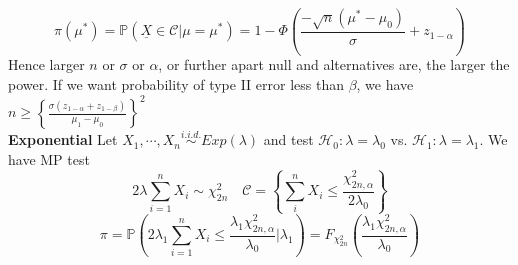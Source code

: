 \documentclass[8pt]{article}
\begin{document}
\begin{multicols}{3}
{\[   \]
   \[
      \pi(\mu^*) = \mathbb{P}(\underline{X} \in \mathcal{C} | \mu = \mu^*) = 1 - \Phi\left( \frac{-\sqrt{n}(\mu^* - \mu_0)}{\sigma} + z_{1 - \alpha} \right)
   \]
   Hence larger $n$ or $\sigma$ or $\alpha$, or further apart null and alternatives are, the larger the power. If we want probability of type II error less than $\beta$, we have $n \geq \left\{ \frac{\sigma(z_{1 - \alpha} + z_{1 - \beta})}{\mu_1 - \mu_0} \right\}^2$\\
   \textbf{Exponential} Let $X_1, \cdots, X_n \stackrel{i.i.d.}{\sim} Exp(\lambda)$ and test $\mathcal{H}_0: \lambda = \lambda_0$ vs. $\mathcal{H}_1: \lambda = \lambda_1$. We have MP test
    \[
      2\lambda\sum_{i=1}^n X_i \sim \chi^2_{2n} \quad \mathcal{C} = \left\{ \sum_i^n X_i \leq \frac{\chi^2_{2n, \alpha}}{2\lambda_0} \right\}
    \]
    \[
      \pi = \mathbb{P}\left( 2\lambda_1 \sum_{i=1}^n X_i \leq \frac{\lambda_1 \chi^2_{2n, \alpha}}{\lambda_0} | \lambda_1 \right) = F_{\chi^2_{2n}}\left( \frac{\lambda_1 \chi^2_{2n, \alpha}}{\lambda_0} \right)
    \]
}
\end{multicols}
\end{document}
